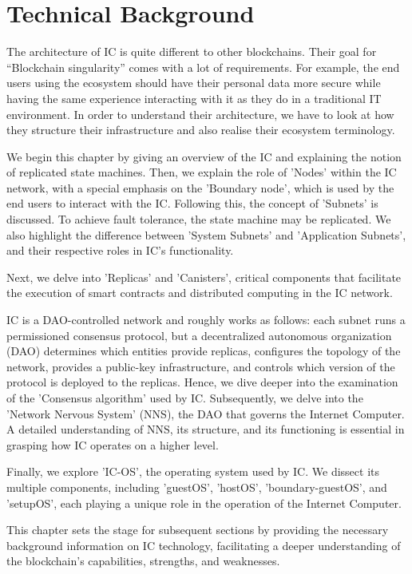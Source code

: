 \chapter{Technical Background}
\label{chap:chapterthree}

The architecture of IC is quite different to other blockchains. Their goal for “Blockchain singularity” comes with a lot of 
requirements. For example, the end users using the ecosystem should have their personal data more secure while having the same 
experience interacting with it as they do in a traditional IT environment.  In order to understand their architecture, we have to 
look at how they structure their infrastructure and also realise their ecosystem terminology. 

We begin this chapter by giving an overview of the IC and explaining the notion of replicated state machines. Then, we explain the 
role of 'Nodes' within the IC network, with a special emphasis on the 'Boundary node', which is used by the end users to interact 
with the IC. Following this, the concept of 'Subnets' is discussed. To achieve fault tolerance, the state machine may be replicated. 
We also highlight the difference between 'System Subnets' and 'Application Subnets', and their respective roles in IC's functionality.

Next, we delve into 'Replicas' and 'Canisters', critical components that facilitate the execution of smart contracts and distributed 
computing in the IC network. 

IC is a DAO-controlled network and roughly works as follows: each subnet runs a permissioned consensus protocol, but a decentralized 
autonomous organization (DAO) determines which entities provide replicas, configures the topology of the network, provides a 
public-key infrastructure, and controls which version of the protocol is deployed to the replicas. Hence, we dive deeper into the 
examination of the 'Consensus algorithm' used by IC. Subsequently, we delve into the 'Network Nervous System' (NNS), the DAO that 
governs the Internet Computer. A detailed understanding of NNS, its structure, and its functioning is essential in grasping how IC 
operates on a higher level.

Finally, we explore 'IC-OS', the operating system used by IC. We dissect its multiple components, including 'guestOS', 'hostOS', 
'boundary-guestOS', and 'setupOS', each playing a unique role in the operation of the Internet Computer.

This chapter sets the stage for subsequent sections by providing the necessary background information on IC technology, facilitating 
a deeper understanding of the blockchain's capabilities, strengths, and weaknesses.



